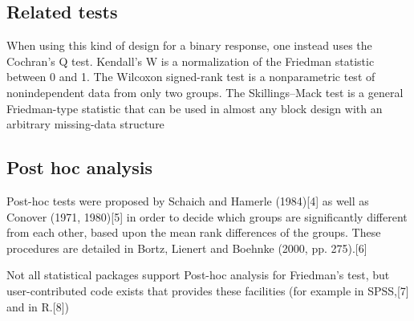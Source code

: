 \subsection{Related tests}
When using this kind of design for a binary response, one instead uses the Cochran's Q test.
Kendall's W is a normalization of the Friedman statistic between 0 and 1.
The Wilcoxon signed-rank test is a nonparametric test of nonindependent data from only two groups.
The Skillings–Mack test is a general Friedman-type statistic that can be used in almost any block design with an arbitrary missing-data structure
\subsection{Post hoc analysis}
Post-hoc tests were proposed by Schaich and Hamerle (1984)[4] as well as Conover (1971, 1980)[5] in order to decide which groups are significantly different from each other, based upon the mean rank differences of the groups. These procedures are detailed in Bortz, Lienert and Boehnke (2000, pp. 275).[6]

Not all statistical packages support Post-hoc analysis for Friedman's test, but user-contributed code exists that provides these facilities (for example in SPSS,[7] and in R.[8])
